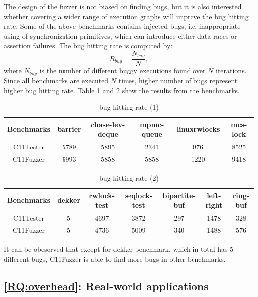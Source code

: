 The design of the fuzzer is not biased on finding bugs, but it is also interested whether covering a wider range of execution graphs will improve the bug hitting rate. Some of the above benchmarks contains injected bugs, i.e. inappropriate using of synchronization primitives, which can introduce either data races or assertion failures. The bug hitting rate is computed by:
\[
	R_{bug} = \frac{N_{bug}}{N},
\]
where $N_{bug}$ is the number of different buggy executions found over $N$ iterations. Since all benchmarks are executed $N$ times, higher number of bugs represent higher bug hitting rate. Table \ref{buggy1} and \ref{buggy2} show the results from the benchmarks.


\begin{table}[h!]
	\begin{tabular}{ |c|ccccc| }
		\hline
		Benchmarks & barrier & chase-lev-deque & mpmc-queue & linuxrwlocks & mcs-lock \\
		\hline
		C11Tester  & 5789    & 5895            & 2341       & 976          & 8525     \\
		C11Fuzzer  & 6993    & 5858            & 5858       & 1220         & 9418     \\
		\hline
	\end{tabular}
	\caption{bug hitting rate (1)}
	\label{buggy1}

\end{table}

\begin{table}[h!]
	\begin{tabular}{ |c|cccccc| }
		\hline
		Benchmarks & dekker & rwlock-test & seqlock-test & bipartite-buf & left-right & ring-buf \\
		\hline
		C11Tester  & 5      & 4697        & 3872         & 297           & 1478       & 328      \\
		C11Fuzzer  & 5      & 4736        & 5009         & 340           & 1488       & 576      \\
		\hline
	\end{tabular}
	\caption{bug hitting rate (2)}
	\label{buggy2}
\end{table}

It can be obeserved that except for dekker benchmark, which in total has 5 different bugs, C11Fuzzer is able to find more bugs in other benchmarks.



\subsection{\ref*{RQ:overhead}: Real-world applications}

